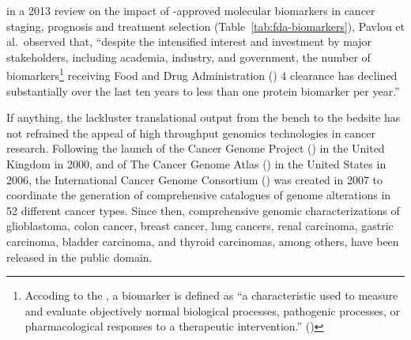 in a 2013 review on the impact of
-approved molecular biomarkers in cancer staging, prognosis and
treatment selection (Table~\ref{tab:fda-biomarkers}), Pavlou et al.~observed
that, ``despite the intensified interest and investment by major stakeholders,
including academia, industry, and government, the number of
biomarkers\footnote{Accoding to the , a biomarker is defined as
  ``a characteristic used to measure and evaluate objectively normal biological
  processes, pathogenic processes, or pharmacological responses to a therapeutic
  intervention.'' (\citealp{downing_biomarkers_2001})} receiving 
Food and Drug Administration () 4 clearance has declined
substantially over the last ten years to less than one protein biomarker per
year.''  %

If anything, the lackluster translational output from the bench to the bedsite
has not refrained the appeal of high throughput genomics technologies in cancer
research.  Following the launch of the Cancer Genome Project ()
in the United Kingdom in 2000, and of The Cancer Genome Atlas ()
in the United States in 2006, the International Cancer Genome Consortium
() was created in 2007 to coordinate the generation of
comprehensive catalogues of genome alterations in 52 different cancer
types.\cite{watson_emerging_2013,lawrence_mutational_2013} Since then,
comprehensive genomic characterizations of glioblastoma, colon cancer, breast
cancer, lung cancers, renal carcinoma, gastric carcinoma, bladder carcinoma, and
thyroid
carcinomas,\cite{mclendon_comprehensive_2008,the_cancer_genome_atlas_network_comprehensive_2012-1,the_cancer_genome_atlas_network_comprehensive_2012,the_cancer_genome_atlas_research_network_comprehensive_2012,the_cancer_genome_atlas_research_network_comprehensive_2014,the_cancer_genome_atlas_research_network_comprehensive_2013,the_cancer_genome_atlas_research_network_comprehensive_2014-1,the_cancer_genome_atlas_research_network_comprehensive_2014-2,agrawal_integrated_2014}
among others, have been released in the public domain.

